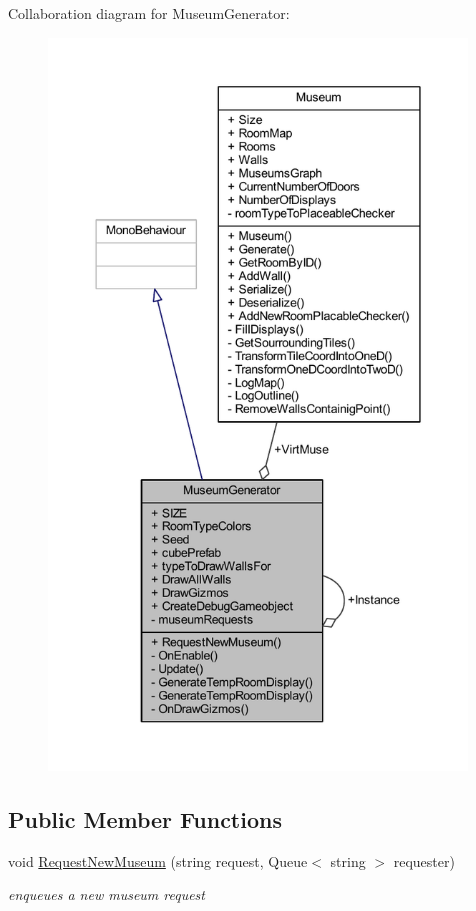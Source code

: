 Collaboration diagram for Museum\+Generator\+:
\nopagebreak
\begin{figure}[H]
\begin{center}
\leavevmode
\includegraphics[height=550pt]{class_museum_generator__coll__graph}
\end{center}
\end{figure}
\subsection*{Public Member Functions}
\begin{DoxyCompactItemize}
\item 
void \mbox{\hyperlink{class_museum_generator_a5ead852effaa81309fe98b4d61fe9759}{Request\+New\+Museum}} (string request, Queue$<$ string $>$ requester)
\begin{DoxyCompactList}\small\item\em enqueues a new museum request \end{DoxyCompactList}\end{DoxyCompactItemize}
